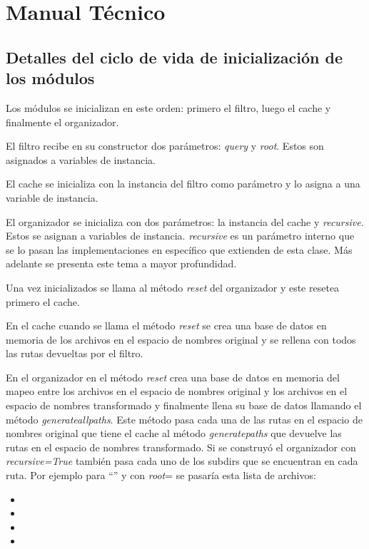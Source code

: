 \chapter{Manual Técnico}

\section{Detalles del ciclo de vida de inicialización de los módulos}
\label{detallesciclodevida}

Los módulos se inicializan en este orden: primero el filtro, luego el cache y finalmente el organizador.

El filtro recibe en su constructor dos parámetros: \textit{query} y \textit{root}. Estos son asignados a variables de instancia.

El cache se inicializa con la instancia del filtro como parámetro y lo asigna a una variable de instancia.

El organizador se inicializa con dos parámetros: la instancia del cache y \textit{recursive}. Estos se asignan a variables de instancia. \textit{recursive} es un parámetro interno que se lo pasan las implementaciones en específico que extienden de esta clase. Más adelante se presenta este tema a mayor profundidad.

Una vez inicializados se llama al método \textit{reset} del organizador y este resetea primero el cache.

En el cache cuando se llama el método \textit{reset} se crea una base de datos en memoria de los archivos en el espacio de nombres original y se rellena con todos las rutas devueltas por el filtro.

En el organizador en el método \textit{reset} crea una base de datos en memoria del mapeo entre los archivos en el espacio de nombres original y los archivos en el espacio de nombres transformado y finalmente llena su base de datos llamando el método \textit{generateallpaths}. Este método pasa cada una de las rutas en el espacio de nombres original que tiene el cache al método \textit{generatepaths} que devuelve las rutas en el espacio de nombres transformado. Si se construyó el organizador con \textit{recursive=True} también pasa cada uno de los subdirs que se encuentran en cada ruta. Por ejemplo para ``'' y con \textit{root}= se pasaría esta lista de archivos:

\begin{itemize}
\item {}
\item {}
\item {}
\item {}
\end{itemize}

